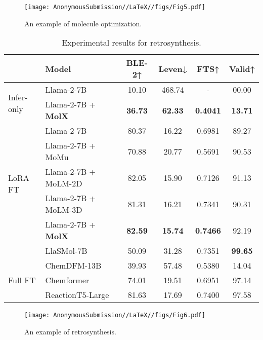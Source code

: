 \begin{figure}[!ht]
    \centering
    \texttt{[image: AnonymousSubmission//LaTeX//figs/Fig5.pdf]}
    \caption{An example of molecule optimization.}
    \label{Fig5}
\end{figure}

\begin{table}[!ht]
\centering
\caption{Experimental results for retrosynthesis.}
\label{retro-synthesis}
\setlength{\tabcolsep}{2.99pt}
\renewcommand{\arraystretch}{0.90}
\scriptsize

\begin{tabular*}{\linewidth}{@{\extracolsep{\fill}}ll|cccc}
\toprule

\multirow[t]{2}{*}{} &\multirow[t]{2}{*}{Model} &BLE-2↑ &Leven↓ &FTS↑ &Valid↑ \\
\midrule
\multirow[t]{2}{*}{Infer-only}
&Llama-2-7B                 &10.10 &468.74 &-      &00.00 \\
&Llama-2-7B + \textbf{MolX} &\textbf{36.73} &\phantom{4}\textbf{62.33} &\textbf{0.4041} &\textbf{13.71} \\
\midrule
\multirow[t]{5}{*}{LoRA FT}
&Llama-2-7B                 &80.37 &\phantom{4}16.22 &0.6981 &89.27 \\
&Llama-2-7B + MoMu          &70.88 &\phantom{4}20.77 &0.5691 &90.53 \\
&Llama-2-7B + MoLM-2D       &82.05 &\phantom{4}15.90 &0.7126 &91.13 \\
&Llama-2-7B + MoLM-3D       &81.31 &\phantom{4}16.21 &0.7341 &90.31 \\
&Llama-2-7B + \textbf{MolX} &\textbf{82.59} &\phantom{4}\textbf{15.74} &\textbf{0.7466} &92.19 \\
\rowcolor{customgray}
&LlaSMol-7B                 &50.09 &\phantom{4}31.28 &0.7351 &\textbf{99.65} \\
\rowcolor{customgray}
&ChemDFM-13B                &39.93 &\phantom{4}57.48 &0.5380 &14.04 \\
\midrule
Full FT
&Chemformer                 &74.01 &\phantom{4}19.51 &0.6951 &97.14 \\
&ReactionT5-Large           &81.63 &\phantom{4}17.69 &0.7400 &97.58 \\

\bottomrule
\end{tabular*}
\end{table}

\begin{figure}[!ht]
    \centering
    \texttt{[image: AnonymousSubmission//LaTeX//figs/Fig6.pdf]}
    \caption{An example of retrosynthesis.}
    \label{Fig6}
\end{figure}


